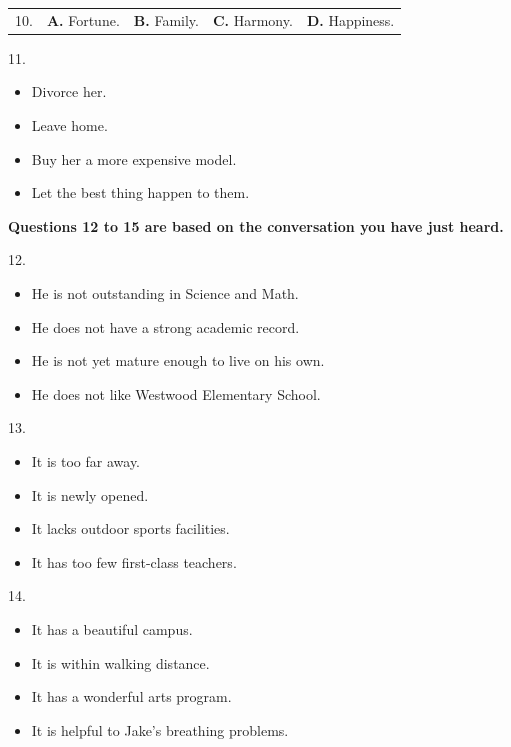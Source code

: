 \documentclass[UTF8,11pt]{ctexart}
\begin{document}
\noindent\begin{tabularx}{\linewidth}{@{}lXXXX@{}}10. & \textbf{A.} Fortune. & \textbf{B.} Family. & \textbf{C.} Harmony. & \textbf{D.} Happiness.\\\end{tabularx}\par

11.


\begin{itemize}[leftmargin=2em,itemsep=.2em,topsep=.4em]\item[A.] Divorce her.
\item[B.] Leave home.
\item[C.] Buy her a more expensive model.
\item[D.] Let the best thing happen to them.
\end{itemize}

\textbf{Questions 12 to 15 are based on the conversation you have just heard.}


12.


\begin{itemize}[leftmargin=2em,itemsep=.2em,topsep=.4em]\item[A.] He is not outstanding in Science and Math.
\item[B.] He does not have a strong academic record.
\item[C.] He is not yet mature enough to live on his own.
\item[D.] He does not like Westwood Elementary School.
\end{itemize}

13.


\begin{itemize}[leftmargin=2em,itemsep=.2em,topsep=.4em]\item[A.] It is too far away.
\item[B.] It is newly opened.
\item[C.] It lacks outdoor sports facilities.
\item[D.] It has too few first-class teachers.
\end{itemize}

14.


\begin{itemize}[leftmargin=2em,itemsep=.2em,topsep=.4em]\item[A.] It has a beautiful campus.
\item[B.] It is within walking distance.
\item[C.] It has a wonderful arts program.
\item[D.] It is helpful to Jake’s breathing problems.
\end{itemize}
\end{document}
